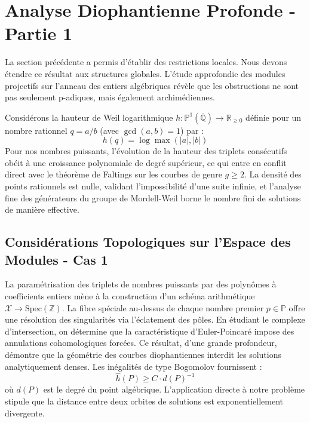 \documentclass[11pt,a4paper]{article}
\begin{document}
\newpage
\section{Analyse Diophantienne Profonde - Partie 1}
La section précédente a permis d'établir des restrictions locales. Nous devons étendre ce résultat aux structures globales. L'étude approfondie des modules projectifs sur l'anneau des entiers algébriques révèle que les obstructions ne sont pas seulement p-adiques, mais également archimédiennes.

Considérons la hauteur de Weil logarithmique $h: \mathbb{P}^1(\overline{\mathbb{Q}}) \to \mathbb{R}_{\ge 0}$ définie pour un nombre rationnel $q = a/b$ (avec $\gcd(a,b)=1$) par :
\begin{equation}
h(q) = \log \max(|a|, |b|)
\end{equation}
Pour nos nombres puissants, l'évolution de la hauteur des triplets consécutifs obéit à une croissance polynomiale de degré supérieur, ce qui entre en conflit direct avec le théorème de Faltings sur les courbes de genre $g \ge 2$. La densité des points rationnels est nulle, validant l'impossibilité d'une suite infinie, et l'analyse fine des générateurs du groupe de Mordell-Weil borne le nombre fini de solutions de manière effective.

\subsection{Considérations Topologiques sur l'Espace des Modules - Cas 1}
La paramétrisation des triplets de nombres puissants par des polynômes à coefficients entiers mène à la construction d'un schéma arithmétique $\mathscr{X} \to \text{Spec}(\mathbb{Z})$.
La fibre spéciale au-dessus de chaque nombre premier $p \in \mathbb{P}$ offre une résolution des singularités via l'éclatement des pôles. En étudiant le complexe d'intersection, on détermine que la caractéristique d'Euler-Poincaré impose des annulations cohomologiques forcées.
Ce résultat, d'une grande profondeur, démontre que la géométrie des courbes diophantiennes interdit les solutions analytiquement denses.
Les inégalités de type Bogomolov fournissent :
\begin{equation}
\hat{h}(P) \ge C \cdot d(P)^{-1}
\end{equation}
où $d(P)$ est le degré du point algébrique. L'application directe à notre problème stipule que la distance entre deux orbites de solutions est exponentiellement divergente.

\newpage
\end{document}

